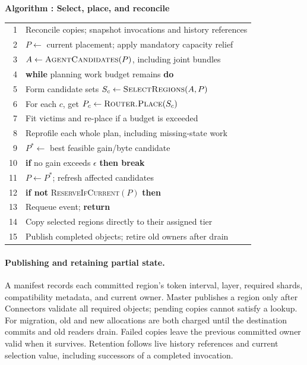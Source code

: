 \par\medskip\noindent\begin{minipage}{\columnwidth}
\raggedright
{}\label{alg:teacher-protection}
\textbf{Algorithm \thedesignalgorithm: Select, place, and reconcile}
\par\smallskip
\begin{tabularx}{\columnwidth}{@{}r@{\quad}X@{}}
\toprule
1 & Reconcile copies; snapshot invocations and history references \\
2 & $P\gets$ current placement; apply mandatory capacity relief \\
3 & $A\gets\textsc{AgentCandidates}(P)$, including joint bundles \\
4 & \textbf{while} planning work budget remains \textbf{do} \\
5 & \quad Form candidate sets $S_c\gets\textsc{SelectRegions}(A,P)$ \\
6 & \quad For each $c$, get $P_c\gets\textsc{Router.Place}(S_c)$ \\
7 & \quad Fit victims and re-place if a budget is exceeded \\
8 & \quad Reprofile each whole plan, including missing-state work \\
9 & \quad $P^*\gets$ best feasible gain/byte candidate \\
10 & \quad \textbf{if} no gain exceeds $\epsilon$ \textbf{then break} \\
11 & \quad $P\gets P^*$; refresh affected candidates \\
12 & \textbf{if not} \textsc{ReserveIfCurrent}$(P)$ \textbf{then} \\
13 & \quad Requeue event; \textbf{return} \\
14 & Copy selected regions directly to their assigned tier \\
15 & Publish completed objects; retire old owners after drain \\
\bottomrule
\end{tabularx}
\end{minipage}\par\medskip

\paragraph{Publishing and retaining partial state.}
A manifest records each committed region's token interval, layer,
required shards, compatibility metadata, and current owner. Master
publishes a region only after Connectors validate all required objects;
pending copies cannot satisfy a lookup. For migration, old and new
allocations are both charged until the destination commits and old
readers drain. Failed copies leave the previous committed owner valid
when it survives. Retention follows live history references and current
selection value, including successors of a completed invocation.

